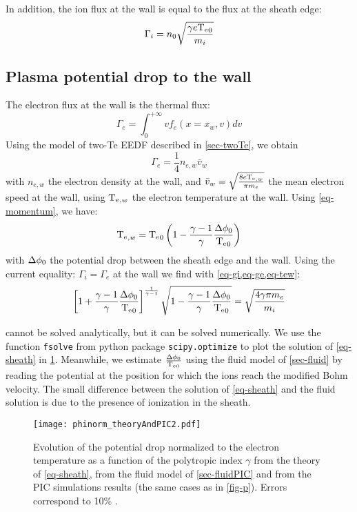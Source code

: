 In addition, the ion flux at the wall is equal to the flux at the sheath edge:
\begin{equation}
  \label{eq-gi}
  \Gamma_i = n_0 \sqrt{\frac{\gamma e \mathrm{T_e}_0}{m_i}}
\end{equation}

\subsection{Plasma potential drop to the wall}
The electron flux at the wall is the thermal flux:
\begin{equation}
  \label{eq-geki}
  \Gamma_e = \int_0^{+\infty} v f_e(x=x_w,v) dv
\end{equation}
Using the model of two-Te EEDF described in \ref{sec-twoTe}, we obtain
\begin{equation}
  \label{eq-ge}
  \Gamma_e = \frac{1}{4} n_{e,w} \bar{v}_w
\end{equation}
with $n_{e,w}$ the electron density at the wall, and $\bar{v}_w = \sqrt{\frac{8 e\mathrm{T_e}_{,w}}{\pi m_e}}$ the mean electron speed at the wall, using $\mathrm{T_e}_{,w}$ the electron temperature at the wall.
Using \cref{eq-momentum}, we have:
\begin{equation}
  \label{eq-tew}
  \mathrm{T_e}_{,w} = \mathrm{T_e}_0 \left(  1 - \frac{\gamma -1}{\gamma}\frac{\Delta \phi_0}{\mathrm{T_e}_0}  \right)
\end{equation}
with $\Delta \phi_0$ the potential drop between the sheath edge and the wall.
Using the current equality: $\Gamma_i = \Gamma_e$ at the wall we find with \cref{eq-gi,eq-ge,eq-tew}:
\begin{equation}\label{eq-sheath}
  \left[ 1 +\frac{\gamma -1}{\gamma} \frac{ \Delta \phi_0}{ \mathrm{T_e}_0}  \right]^{\frac{1}{\gamma - 1}} \sqrt{1 - \frac{\gamma -1}{\gamma}\frac{\Delta \phi_0}{\mathrm{T_e}_0}} = \sqrt{\frac{4 \gamma \pi m_e}{m_i}}
\end{equation}

 cannot be solved analytically, but it can be solved numerically.
We use the function \texttt{fsolve} from python package \texttt{scipy.optimize} to plot the solution of \cref{eq-sheath} in \cref{fig-dphinorm}.
Meanwhile, we estimate $\frac{\Delta \phi_0}{\mathrm{T_e}_0}$ using the fluid model of \cref{sec-fluid} by reading the potential at the position for which the ions reach the modified Bohm velocity.
The small difference between the solution of \cref{eq-sheath} and the fluid solution is due to the presence of ionization in the sheath.

\begin{figure}[!htbp]
  \centering
  \texttt{[image: phinorm\_theoryAndPIC2.pdf]}
  \caption{Evolution of the potential drop normalized to the electron temperature as a function of the polytropic index $\gamma$ from the theory of \cref{eq-sheath}, from the fluid model of \cref{sec-fluidPIC} and from the PIC simulations results (the same cases as in \cref{fig-p}). Errors correspond to 10\% . }
  \label{fig-dphinorm}
\end{figure}


